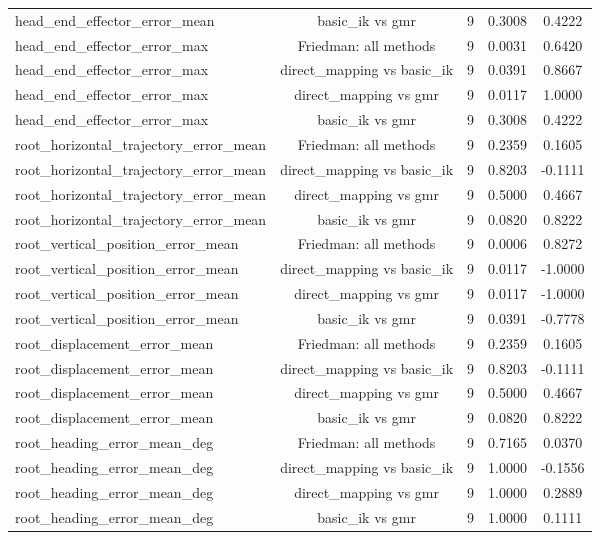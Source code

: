 \begin{table}[t]
{\begin{tabular}{lcccc}
head\_end\_effector\_error\_mean & basic\_ik vs gmr & 9 & 0.3008 & 0.4222 \\
head\_end\_effector\_error\_max & Friedman: all methods & 9 & 0.0031 & 0.6420 \\
head\_end\_effector\_error\_max & direct\_mapping vs basic\_ik & 9 & 0.0391 & 0.8667 \\
head\_end\_effector\_error\_max & direct\_mapping vs gmr & 9 & 0.0117 & 1.0000 \\
head\_end\_effector\_error\_max & basic\_ik vs gmr & 9 & 0.3008 & 0.4222 \\
root\_horizontal\_trajectory\_error\_mean & Friedman: all methods & 9 & 0.2359 & 0.1605 \\
root\_horizontal\_trajectory\_error\_mean & direct\_mapping vs basic\_ik & 9 & 0.8203 & -0.1111 \\
root\_horizontal\_trajectory\_error\_mean & direct\_mapping vs gmr & 9 & 0.5000 & 0.4667 \\
root\_horizontal\_trajectory\_error\_mean & basic\_ik vs gmr & 9 & 0.0820 & 0.8222 \\
root\_vertical\_position\_error\_mean & Friedman: all methods & 9 & 0.0006 & 0.8272 \\
root\_vertical\_position\_error\_mean & direct\_mapping vs basic\_ik & 9 & 0.0117 & -1.0000 \\
root\_vertical\_position\_error\_mean & direct\_mapping vs gmr & 9 & 0.0117 & -1.0000 \\
root\_vertical\_position\_error\_mean & basic\_ik vs gmr & 9 & 0.0391 & -0.7778 \\
root\_displacement\_error\_mean & Friedman: all methods & 9 & 0.2359 & 0.1605 \\
root\_displacement\_error\_mean & direct\_mapping vs basic\_ik & 9 & 0.8203 & -0.1111 \\
root\_displacement\_error\_mean & direct\_mapping vs gmr & 9 & 0.5000 & 0.4667 \\
root\_displacement\_error\_mean & basic\_ik vs gmr & 9 & 0.0820 & 0.8222 \\
root\_heading\_error\_mean\_deg & Friedman: all methods & 9 & 0.7165 & 0.0370 \\
root\_heading\_error\_mean\_deg & direct\_mapping vs basic\_ik & 9 & 1.0000 & -0.1556 \\
root\_heading\_error\_mean\_deg & direct\_mapping vs gmr & 9 & 1.0000 & 0.2889 \\
root\_heading\_error\_mean\_deg & basic\_ik vs gmr & 9 & 1.0000 & 0.1111 \\

\end{tabular}}
\end{table}
